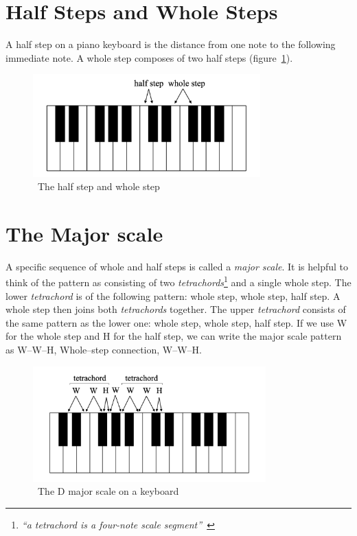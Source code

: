 \section{Half Steps and Whole Steps}\label{sec:half-whole-steps}

A half step on a piano keyboard is the distance from one note to the following immediate note.
A whole step composes of two half steps (figure~\ref{fig:half-whole-steps}).~\cite{music-theory}


\begin{figure}
    \centering
    \includegraphics[width=0.78\textwidth]{assets/half-whole-steps}
    \caption{~The half step and whole step~\cite{music-theory}}\label{fig:half-whole-steps}
\end{figure}


\section{The Major scale}\label{sec:major-scale}

A specific sequence of whole and half steps is called a \textit{major scale}.
It is helpful to think of the pattern as consisting of two \textit{tetrachords}\footnote{\textit{``a tetrachord is a four-note scale segment''~\cite{music-theory}}} and a single whole step.
The lower \textit{tetrachord} is of the following pattern: whole step, whole step, half step.
A whole step then joins both \textit{tetrachords} together.
The upper \textit{tetrachord} consists of the same pattern as the lower one: whole step, whole step, half step.
If we use W for the whole step and H for the half step, we can write the major scale pattern as W--W--H, Whole–step connection, W--W--H.~\cite{music-theory}


\begin{figure}
    \centering
    \includegraphics[width=0.8\textwidth]{assets/major-scale-keyboard}
    \caption{~The D major scale on a keyboard~\cite{music-theory}}\label{fig:major-scale-keyboard}
\end{figure}


